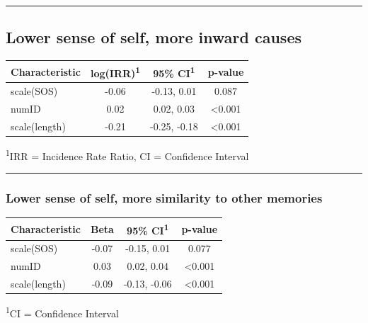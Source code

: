 \documentclass[
  .7em,
  letterpaper,
  DIV=11,
  numbers=noendperiod]{scrartcl}
\begin{document}
\begin{center}\rule{0.5\linewidth}{0.5pt}\end{center}

\hypertarget{lower-sense-of-self-more-inward-causes}{%
\subsection{Lower sense of self, more inward
causes}\label{lower-sense-of-self-more-inward-causes}}

\captionsetup[table]{labelformat=empty,skip=1pt}
\setlength{\LTpost}{0mm}
\begin{longtable}{lccc}
\toprule
\textbf{Characteristic} & \textbf{log(IRR)}\textsuperscript{1} & \textbf{95\% CI}\textsuperscript{1} & \textbf{p-value} \\ 
\midrule
scale(SOS) & -0.06 & -0.13, 0.01 & 0.087 \\ 
numID & 0.02 & 0.02, 0.03 & <0.001 \\ 
scale(length) & -0.21 & -0.25, -0.18 & <0.001 \\ 
\bottomrule
\end{longtable}
\begin{minipage}{\linewidth}
\textsuperscript{1}IRR = Incidence Rate Ratio, CI = Confidence Interval\\
\end{minipage}

\begin{center}\rule{0.5\linewidth}{0.5pt}\end{center}

\hypertarget{lower-sense-of-self-more-similarity-to-other-memories}{%
\subsubsection{Lower sense of self, more similarity to other
memories}\label{lower-sense-of-self-more-similarity-to-other-memories}}

\captionsetup[table]{labelformat=empty,skip=1pt}
\setlength{\LTpost}{0mm}
\begin{longtable}{lccc}
\toprule
\textbf{Characteristic} & \textbf{Beta} & \textbf{95\% CI}\textsuperscript{1} & \textbf{p-value} \\ 
\midrule
scale(SOS) & -0.07 & -0.15, 0.01 & 0.077 \\ 
numID & 0.03 & 0.02, 0.04 & <0.001 \\ 
scale(length) & -0.09 & -0.13, -0.06 & <0.001 \\ 
\bottomrule
\end{longtable}
\begin{minipage}{\linewidth}
\textsuperscript{1}CI = Confidence Interval\\
\end{minipage}
\end{document}
